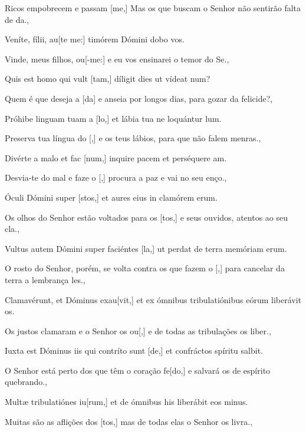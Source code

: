 {        {Ricos empobrecem e passam [me,] Mas os que buscam o Senhor não sentirão falta de da.},
    {\item {}Veníte, fílii, au[te me:] timórem Dómini dobo vos.}%
        {Vinde, meus filhos, ou[-me:] e eu vos ensinarei o temor do Se.},
    {\item {}Quis est homo qui vult [tam,] díligit dies ut vídeat \-num?}%
        {Quem é que deseja a [da] e anseia por longos dias, para gozar da felicide?},
    {\item {}Próhibe linguam tuam a [lo,] et lábia tua ne lo\-quántur \-lum.}%
        {Preserva tua língua do [,] e os teus lábios, para que não falem menras.},
    {\item {}Divérte a malo et fac [num,] inquire pacem et perséquere am.}%
        {Desvia-te do mal e faze o [,] procura a paz e vai no seu enço.},
    {\item {}Óculi Dómini super [stos,] et aures eius in clamórem erum.}%
        {Os olhos do Senhor estão voltados para os [tos,] e seus ouvidos, atentos ao seu cla.},
    {\item {}Vultus autem Dómini super faciéntes [la,] ut perdat de ter\-ra memóriam erum.}%
        {O rosto do Senhor, porém, se volta contra os que fazem o [,] para cancelar da terra a lembrança les.},
    {\item {}Clamavérunt, et Dóminus exau[vit,] et ex ómnibus tribulatiónibus eórum liberávit os.}%
        {Os justos clamaram e o Senhor os ou[,] e de todas as tribulações os liber.},
    {\item {}Iuxta est Dóminus iis qui contríto sunt [de,] et confráctos spíritu salbit.}%
        {O Senhor está perto dos que têm o coração fe[do,] e salvará os de espírito quebrando.},
    {\item {}Multæ tribulatiónes iu[rum,] et de ómnibus his liberábit eos minus.}%
        {Muitas são as aflições dos [tos,] mas de todas elas o Senhor os livra.},
}
